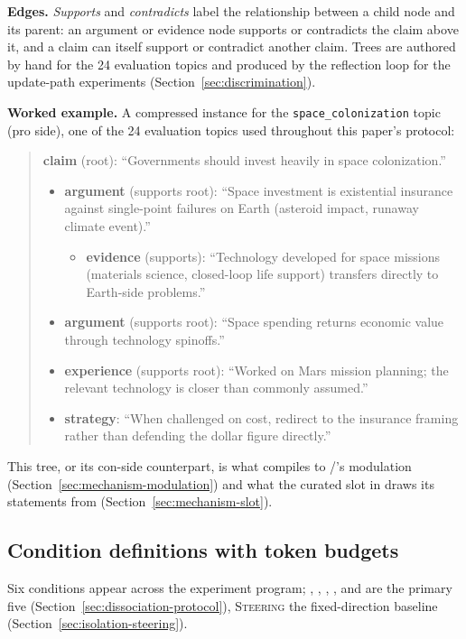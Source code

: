 \textbf{Edges.} \emph{Supports} and \emph{contradicts} label the relationship between a
child node and its parent: an argument or evidence node supports or contradicts the
claim above it, and a claim can itself support or contradict another claim. Trees are
authored by hand for the 24 evaluation topics and produced by the reflection loop for
the update-path experiments (Section~\ref{sec:discrimination}).

\textbf{Worked example.} A compressed instance for the \texttt{space\_colonization}
topic (pro side), one of the 24 evaluation topics used throughout this paper's
protocol:
\begin{quote}\small
\textbf{claim} (root): ``Governments should invest heavily in space colonization.''
\begin{itemize}
  \item \textbf{argument} (supports root): ``Space investment is existential insurance
  against single-point failures on Earth (asteroid impact, runaway climate event).''
  \begin{itemize}
    \item \textbf{evidence} (supports): ``Technology developed for space missions
    (materials science, closed-loop life support) transfers directly to Earth-side
    problems.''
  \end{itemize}
  \item \textbf{argument} (supports root): ``Space spending returns economic value
  through technology spinoffs.''
  \item \textbf{experience} (supports root): ``Worked on Mars mission planning; the
  relevant technology is closer than commonly assumed.''
  \item \textbf{strategy}: ``When challenged on cost, redirect to the insurance framing
  rather than defending the dollar figure directly.''
\end{itemize}
\end{quote}
This tree, or its con-side counterpart, is what compiles to \condC{}/\condF{}'s
modulation (Section~\ref{sec:mechanism-modulation}) and what the curated slot in
\condF{} draws its statements from (Section~\ref{sec:mechanism-slot}).

\subsection{Condition definitions with token budgets}
\label{app:conditions}

Six conditions appear across the experiment program; \condA{}, \condB{}, \condC{},
\condD{}, and \condF{} are the primary five (Section~\ref{sec:dissociation-protocol}),
\textsc{Steering} the fixed-direction baseline (Section~\ref{sec:isolation-steering}).

